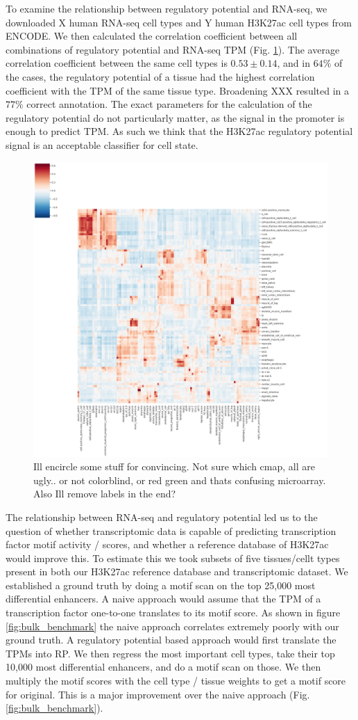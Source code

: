To examine the relationship between regulatory potential and RNA-seq, we downloaded X human RNA-seq cell types and Y human H3K27ac cell types from ENCODE. We then calculated the correlation coefficient between all combinations of regulatory potential and RNA-seq TPM (Fig. \ref{fig:celltypes}). The average correlation coefficient between the same cell types is $0.53 \pm 0.14$, and in $64\%$ of the cases, the regulatory potential of a tissue had the highest correlation coefficient with the TPM of the same tissue type. Broadening XXX resulted in a $77\%$ correct annotation. The exact parameters for the calculation of the regulatory potential do not particularly matter, as the signal in the promoter is enough to predict TPM. As such we think that the H3K27ac regulatory potential signal is an acceptable classifier for cell state.
\begin{figure}
    \centering
    \includegraphics[width=0.75\linewidth]{ch.scepia/imgs/celltypes.png}
    \caption{Ill encircle some stuff for convincing. Not sure which cmap, all are ugly.. or not colorblind, or red green and thats confusing microarray. Also Ill remove labels in the end?}
    \label{fig:celltypes}
\end{figure}
The relationship between RNA-seq and regulatory potential led us to the question of whether transcriptomic data is capable of predicting transcription factor motif activity / scores, and whether a reference database of H3K27ac would improve this. To estimate this we took subsets of five tissues/cellt types present in both our H3K27ac reference database and transcriptomic dataset. We established a ground truth by doing a motif scan on the top 25,000 most differential enhancers. A naive approach would assume that the TPM of a transcription factor one-to-one translates to its motif score. As shown in figure \ref{fig:bulk_benchmark} the naive approach correlates extremely poorly with our ground truth. A regulatory potential based approach would first translate the TPMs into RP. We then regress the most important cell types, take their top 10,000 most differential enhancers, and do a motif scan on those. We then multiply the motif scores with the cell type / tissue weights to get a motif score for original. This is a major improvement over the naive approach (Fig. \ref{fig:bulk_benchmark}). 


